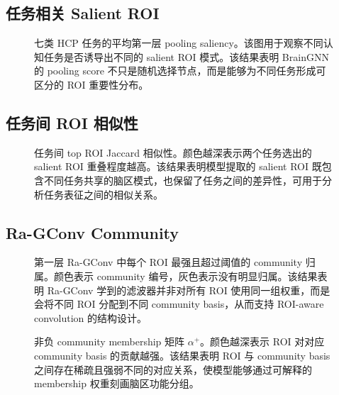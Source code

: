 \subsection{任务相关 Salient ROI}

\begin{figure}[H]
  \centering
  \caption{七类 HCP 任务的平均第一层 pooling saliency。该图用于观察不同认知任务是否诱导出不同的 salient ROI 模式。该结果表明 BrainGNN 的 pooling score 不只是随机选择节点，而是能够为不同任务形成可区分的 ROI 重要性分布。}
  \label{fig:task-salient-rois}
\end{figure}

\subsection{任务间 ROI 相似性}

\begin{figure}[H]
  \centering
  \caption{任务间 top ROI Jaccard 相似性。颜色越深表示两个任务选出的 salient ROI 重叠程度越高。该结果表明模型提取的 salient ROI 既包含不同任务共享的脑区模式，也保留了任务之间的差异性，可用于分析任务表征之间的相似关系。}
  \label{fig:task-roi-similarity}
\end{figure}

\subsection{Ra-GConv Community}

\begin{figure}[H]
  \centering
  \caption{第一层 Ra-GConv 中每个 ROI 最强且超过阈值的 community 归属。颜色表示 community 编号，灰色表示没有明显归属。该结果表明 Ra-GConv 学到的滤波器并非对所有 ROI 使用同一组权重，而是会将不同 ROI 分配到不同 community basis，从而支持 ROI-aware convolution 的结构设计。}
  \label{fig:community-assignment}
\end{figure}

\begin{figure}[H]
  \centering
  \caption{非负 community membership 矩阵 $\alpha^+$。颜色越深表示 ROI 对对应 community basis 的贡献越强。该结果表明 ROI 与 community basis 之间存在稀疏且强弱不同的对应关系，使模型能够通过可解释的 membership 权重刻画脑区功能分组。}
  \label{fig:alpha-heatmap}
\end{figure}
